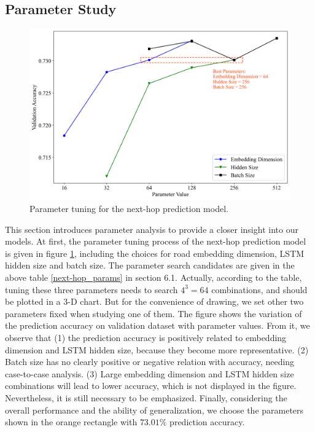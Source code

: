 \subsection{Parameter Study}
\begin{figure}[htb]
    \centering
    \includegraphics[width=\textwidth]{images/next-hop_param.png}
    \caption{Parameter tuning for the next-hop prediction model.}
    \label{fig: next-hop_param}
\end{figure}

This section introduces parameter analysis to provide a closer insight into our models. At first, the parameter tuning process of the next-hop prediction model is given in figure \ref{fig: next-hop_param}, including the choices for road embedding dimension, LSTM hidden size and batch size. The parameter search candidates are given in the above table \ref{next-hop_params} in section 6.1. Actually, according to the table, tuning these three parameters needs to search $4^3=64$ combinations, and should be plotted in a 3-D chart. But for the convenience of drawing, we set other two parameters fixed when studying one of them. The figure shows the variation of the prediction accuracy on validation dataset with parameter values. From it, we observe that (1) the prediction accuracy is positively related to embedding dimension and LSTM hidden size, because they become more representative. (2) Batch size has no clearly positive or negative relation with accuracy, needing case-to-case analysis. (3) Large embedding dimension and LSTM hidden size combinations will lead to lower accuracy, which is not displayed in the figure. Nevertheless, it is still necessary to be emphasized. Finally, considering the overall performance and the ability of generalization, we choose the parameters shown in the orange rectangle with $73.01\%$ prediction accuracy.

